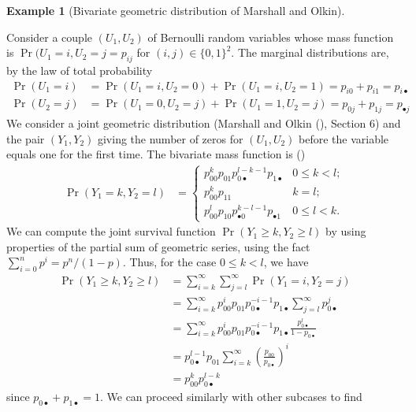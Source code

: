 \documentclass[
  11pt,
  letterpaper,
]{scrbook}
\theoremstyle{definition}
\theoremstyle{plain}
\theoremstyle{plain}
\theoremstyle{definition}
\newtheorem{example}{Example}[chapter]
\theoremstyle{definition}
\theoremstyle{remark}
\begin{document}
\begin{example}[Bivariate geometric distribution of Marshall and
Olkin]\protect\hypertarget{exm-biv-geometric}{}\label{exm-biv-geometric}

Consider a couple \((U_1, U_2)\) of Bernoulli random variables whose
mass function is \(\Pr(U_1=i, U_2=j=p_{ij}\) for
\((i,j) \in \{0,1\}^2\). The marginal distributions are, by the law of
total probability \begin{align*}
\Pr(U_1=i) &= \Pr(U_1=i, U_2=0) + \Pr(U_1=i, U_2=1) = p_{i0} + p_{i1} = p_{i\bullet}\\
\Pr(U_2=j) &= \Pr(U_1=0, U_2=j) + \Pr(U_1=1, U_2=j) = p_{0j} + p_{1j} = p_{\bullet j}
\end{align*} We consider a joint geometric distribution (Marshall and
Olkin (), Section 6) and the
pair \((Y_1, Y_2)\) giving the number of zeros for \((U_1, U_2)\) before
the variable equals one for the first time. The bivariate mass function
is () \begin{align*}
\Pr(Y_1 = k, Y_2 = l) &= 
\begin{cases}
p_{00}^kp_{01}p_{0 \bullet}^{l-k-1}p_{1 \bullet} & 0 \leq k < l; \\
p_{00}^kp_{11} & k=l; \\
p_{00}^lp_{10}p_{\bullet 0}^{k-l-1}p_{\bullet 1} & 0 \leq l < k.
\end{cases}
\end{align*} We can compute the joint survival function
\(\Pr(Y_1 \ge k, Y_2 \ge l)\) by using properties of the partial sum of
geometric series, using the fact \(\sum_{i=0}^n p^i = p^n/(1-p)\). Thus,
for the case \(0\leq k < l\), we have \begin{align*}
\Pr(Y_1 \ge k, Y_2 \ge l) &= \sum_{i=k}^\infty \sum_{j=l}^\infty \Pr(Y_1 = i, Y_2 = j)\\
&= \sum_{i=k}^\infty p_{00}^ip_{01}p_{0 \bullet}^{-i-1}p_{1 \bullet} \sum_{j=l}^\infty p_{0 \bullet}^{j}
\\&=\sum_{i=k}^\infty p_{00}^ip_{01}p_{0 \bullet}^{-i-1}p_{1 \bullet} \frac{p_{0 \bullet}^{l}}{1-p_{0\bullet}} \\&= p_{0 \bullet}^{l-1}p_{01} \sum_{i=k}^\infty \left(\frac{p_{00}}{p_{0 \bullet}}\right)^{i}
\\& = p_{00}^k p_{0 \bullet}^{l-k}
\end{align*} since \(p_{0\bullet} + p_{1\bullet} = 1\). We can proceed
similarly with other subcases to find \begin{align*}

\end{align*}
\end{example}
\end{document}
